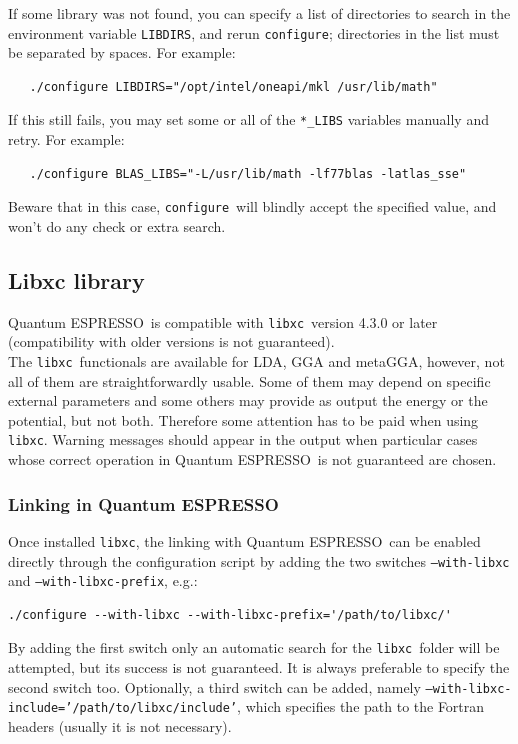 \documentclass[12pt,a4paper]{article}
\def\qe{{\sc Quantum ESPRESSO}}
\def\configure{\texttt{configure}}
\def\libxc{\texttt{libxc}}
\begin{document}
If some library was not found, you can specify a list of directories to search
in the environment variable \texttt{LIBDIRS},
and rerun \configure; directories in the
list must be separated by spaces. For example:
\begin{verbatim}
   ./configure LIBDIRS="/opt/intel/oneapi/mkl /usr/lib/math"
\end{verbatim}
If this still fails, you may set some or all of the \texttt{*\_LIBS} variables manually
and retry. For example:
\begin{verbatim}
   ./configure BLAS_LIBS="-L/usr/lib/math -lf77blas -latlas_sse"
\end{verbatim}
Beware that in this case, \configure\ will blindly accept the specified value,
and won't do any check or extra search.

\subsection{Libxc library}

\qe\ is compatible with \libxc\ version 4.3.0 or later (compatibility with older versions is not guaranteed).\\
The \libxc\ functionals are available for LDA, GGA and metaGGA, however, not all of them are straightforwardly usable. Some of them may depend on specific external parameters and some others may provide as output the energy or the potential, but not both. Therefore some attention has to be paid when using \libxc. Warning messages should appear in the output when particular cases whose correct operation in \qe\ is not guaranteed are chosen.

\subsubsection{Linking in \qe}
Once installed \libxc, the linking with \qe\ can be enabled directly through the configuration script by adding the two switches \texttt{--with-libxc} and \texttt{--with-libxc-prefix}, e.g.:
\begin{verbatim}
./configure --with-libxc --with-libxc-prefix='/path/to/libxc/'
\end{verbatim}
By adding the first switch only an automatic search for the \libxc\ folder will be attempted, but its success is not guaranteed. It is always preferable to specify the second switch too. Optionally, a third switch can be added, namely \texttt{--with-libxc-include='/path/to/libxc/include'}, which specifies the path to the Fortran headers (usually it is not necessary).
\end{document}
